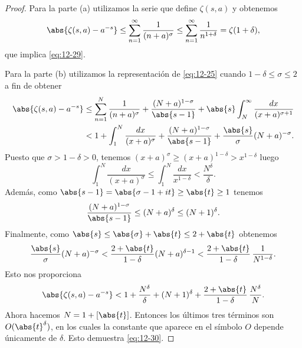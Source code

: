 \documentclass[12pt,a4paper]{book}
\begin{document}
    \begin{proof}
        Para la parte (a) utilizamos la serie que define $\zeta(s,a)$ y obtenemos
        \begin{equation*}
            \abs{\zeta(s,a)-a^{-s}}\leq\sum_{n=1}^{\infty}\frac{1}{(n+a)^{\sigma}}\leq\sum_{n=1}^{\infty}\frac{1}{n^{1+\delta}}=\zeta(1+\delta),
        \end{equation*}
        que implica \eqref{eq:12-29}.

        Para la parte (b) utilizamos la representación de \eqref{eq:12-25} cuando
        $1-\delta\leq\sigma\leq2$ a fin de obtener
        \begin{align*}
            \abs{\zeta(s,a)-a^{-s}}&\leq\sum_{n=1}^{N}\frac{1}{(n+a)^{\sigma}}+\frac{(N+a)^{1-\sigma}}{\abs{s-1}}+\abs{s}\int_{N}^{\infty}\frac{dx}{(x+a)^{\sigma+1}}\\
            &<1+\int_{1}^{N}\frac{dx}{(x+a)^{\sigma}}+\frac{(N+a)^{1-\sigma}}{\abs{s-1}}+\frac{\abs{s}}{\sigma}(N+a)^{-\sigma}.
        \end{align*}
        Puesto que $\sigma>1-\delta>0$, tenemos $(x+a)^{\sigma}\geq(x+a)^{1-\delta}>x^{1-\delta}$
        luego
        \begin{equation*}
            \int_{1}^{N}\frac{dx}{(x+a)^{\sigma}}\leq\int_{1}^{N}\frac{dx}{x^{1-\delta}}<\frac{N^{\delta}}{\delta}.
        \end{equation*}
        Además, como $\abs{s-1}=\abs{\sigma-1+it}\geq\abs{t}\geq1$ tenemos
        \begin{equation*}
            \frac{(N+a)^{1-\sigma}}{\abs{s-1}}\leq(N+a)^{\delta}\leq(N+1)^{\delta}.
        \end{equation*}
        Finalmente, como $\abs{s}\leq\abs{\sigma}+\abs{t}\leq2+\abs{t}$ obtenemos
        \begin{equation*}
            \frac{\abs{s}}{\sigma}(N+a)^{-\sigma}<\frac{2+\abs{t}}{1-\delta}(N+a)^{\delta-1}<\frac{2+\abs{t}}{1-\delta}\,\frac{1}{N^{1-\delta}}.
        \end{equation*}
        Esto nos proporciona
        \begin{equation*}
            \abs{\zeta(s,a)-a^{-s}}<1+\frac{N^{\delta}}{\delta}+(N+1)^{\delta}+\frac{2+\abs{t}}{1-\delta}\,\frac{N^{\delta}}{N}.
        \end{equation*}
        Ahora hacemos $N=1+[\abs{t}]$. Entonces los últimos tres términos son
        $O(\abs{t}^{\delta})$, en los cuales la constante que aparece en el símbolo $O$ depende
        únicamente de $\delta$. Esto demuestra \eqref{eq:12-30}.


\end{proof}
\end{document}
